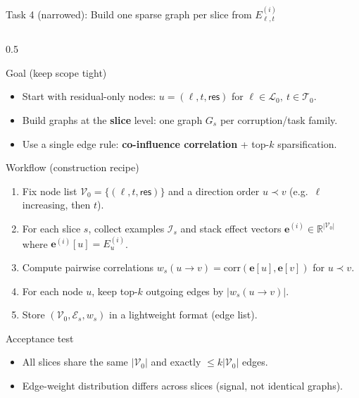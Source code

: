 \documentclass[aspectratio=169,xcolor={dvipsnames}]{beamer}
\renewcommand{\accent}[1]{\textbf{#1}}
\newcommand{\R}{\mathbb{R}}
\begin{document}
\begin{frame}[fragile,shrink=34]{Task 4 (narrowed): Build one sparse graph per slice from $E^{(i)}_{\ell,t}$}
\small
\begin{columns}[T,onlytextwidth]
\begin{column}{0.5\textwidth}
\begin{block}{Goal (keep scope tight)}
\begin{itemize}\setlength\itemsep{3pt}
\item Start with residual-only nodes: $u=(\ell,t,\textsf{res})$ for $\ell\in\mathcal{L}_0,\ t\in\mathcal{T}_0$.
\item Build graphs at the \accent{slice} level: one graph $G_s$ per corruption/task family.
\item Use a single edge rule: \accent{co-influence correlation} + top-$k$ sparsification.
\end{itemize}
\end{block}

\begin{block}{Workflow (construction recipe)}
\begin{enumerate}\setlength\itemsep{2pt}
\item Fix node list $\mathcal{V}_0=\{(\ell,t,\textsf{res})\}$ and a direction order $u\prec v$
(e.g.\ $\ell$ increasing, then $t$).
\item For each slice $s$, collect examples $\mathcal{I}_s$ and stack effect vectors
$\mathbf{e}^{(i)}\in\R^{|\mathcal{V}_0|}$ where $\mathbf{e}^{(i)}[u]=E_u^{(i)}$.
\item Compute pairwise correlations $w_s(u\to v)=\mathrm{corr}(\mathbf{e}[u],\mathbf{e}[v])$ for $u\prec v$.
\item For each node $u$, keep top-$k$ outgoing edges by $|w_s(u\to v)|$.
\item Store $(\mathcal{V}_0,\mathcal{E}_s,w_s)$ in a lightweight format (edge list).
\end{enumerate}
\end{block}

\begin{block}{Acceptance test}
\begin{itemize}\setlength\itemsep{2pt}
\item All slices share the same $|\mathcal{V}_0|$ and exactly $\le k|\mathcal{V}_0|$ edges.
\item Edge-weight distribution differs across slices (signal, not identical graphs).
\end{itemize}
\end{block}
\end{column}


\end{columns}
\end{frame}
\end{document}
